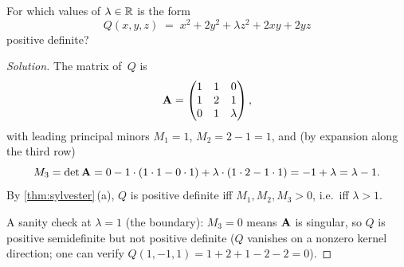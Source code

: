 \begin{problem}
\label{prob:sylvester-parameter}
For which values of $\lambda \in \mathbb{R}$ is the form
\[
  Q(x, y, z) \;=\; x^2 + 2y^2 + \lambda z^2 + 2xy + 2yz
\]
positive definite?
\end{problem}

\begin{proof}[Solution]
The matrix of~$Q$ is
\[
  \mathbf{A} = \begin{pmatrix} 1 & 1 & 0 \\ 1 & 2 & 1 \\ 0 & 1 & \lambda \end{pmatrix},
\]
with leading principal minors $M_1 = 1$, $M_2 = 2 - 1 = 1$, and (by
expansion along the third row)
\[
  M_3 = \det \mathbf{A} = 0 - 1 \cdot (1 \cdot 1 - 0 \cdot 1) + \lambda \cdot (1 \cdot 2 - 1 \cdot 1)
      = -1 + \lambda = \lambda - 1.
\]
By \cref{thm:sylvester}\,(a), $Q$ is positive definite iff
$M_1, M_2, M_3 > 0$, i.e.\ iff $\lambda > 1$.

A sanity check at $\lambda = 1$ (the boundary): $M_3 = 0$ means
$\mathbf{A}$ is singular, so $Q$ is positive semidefinite but not
positive definite ($Q$ vanishes on a nonzero kernel direction; one
can verify $Q(1, -1, 1) = 1 + 2 + 1 - 2 - 2 = 0$).
\end{proof}
